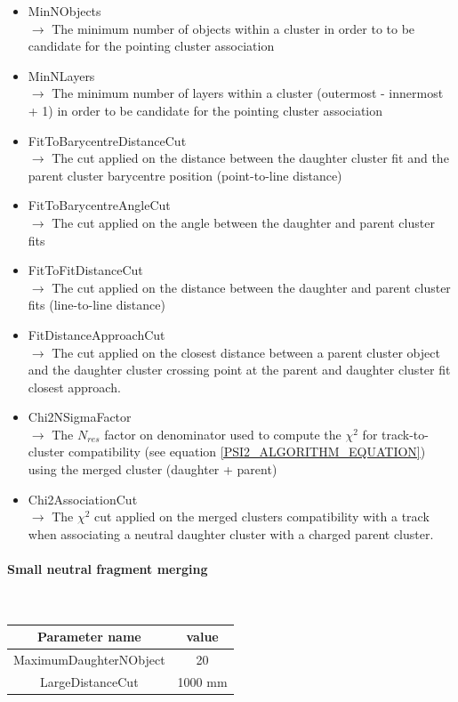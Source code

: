 \documentclass[12pt]{article}
\begin{document}
\begin{itemize}
  \item MinNObjects \\
  $\rightarrow$ The minimum number of objects within a cluster in order to to be candidate for the pointing cluster association
  \item MinNLayers \\
  $\rightarrow$ The minimum number of layers within a cluster (outermost - innermost + 1) in order to be candidate for the pointing cluster association
  \item FitToBarycentreDistanceCut \\
  $\rightarrow$ The cut applied on the distance between the daughter cluster fit and the parent cluster barycentre position (point-to-line distance)
  \item FitToBarycentreAngleCut \\
  $\rightarrow$ The cut applied on the angle between the daughter and parent cluster fits
  \item FitToFitDistanceCut \\
  $\rightarrow$ The cut applied on the distance between the daughter and parent cluster fits (line-to-line distance)
  \item FitDistanceApproachCut \\
  $\rightarrow$ The cut applied on the closest distance between a parent cluster object and the daughter cluster crossing point at the parent and daughter cluster fit closest approach.
  \item Chi2NSigmaFactor \\
  $\rightarrow$ The $N_{res}$ factor on denominator used to compute the $\chi^2$ for track-to-cluster compatibility (see equation \ref{PSI2_ALGORITHM_EQUATION}) using the merged cluster (daughter + parent)
  \item Chi2AssociationCut \\
  $\rightarrow$ The $\chi^2$ cut applied on the merged clusters compatibility with a track when associating a neutral daughter cluster with a charged parent cluster.
\end{itemize}


\paragraph{Small neutral fragment merging} ~

\begin{table}[!ht]
  \begin{center}
    \begin{tabu} to \linewidth { c | c } 
          Parameter name & value \\
          \hline
          MaximumDaughterNObject & 20 \\
          LargeDistanceCut & 1000 mm
    \end{tabu}
  \end{center}
\end{table}
\end{document}
